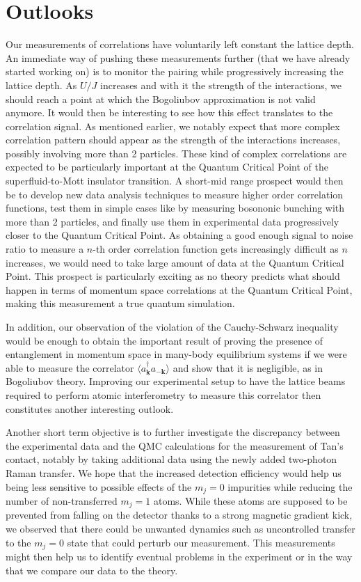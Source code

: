 \section*{Outlooks}

Our measurements of \kmk correlations have voluntarily left constant the lattice depth. An immediate way of pushing these measurements further (that we have already started working on) is to monitor the pairing while progressively increasing the lattice depth. As $U/J$ increases and with it the strength of the interactions, we should reach a point at which the Bogoliubov approximation is not valid anymore. It would then be interesting to see how this effect translates to the \kmk correlation signal. As mentioned earlier, we notably expect that more complex correlation pattern should appear as the strength of the interactions increases, possibly involving more than 2 particles. These kind of complex correlations are expected to be particularly important at the Quantum Critical Point of the superfluid-to-Mott insulator transition. A short-mid range prospect would then be to develop new data analysis techniques to measure higher order correlation functions, test them in simple cases like by measuring bosononic bunching with more than 2 particles, and finally use them in experimental data progressively closer to the Quantum Critical Point. As obtaining a good enough signal to noise ratio to measure a $n$-th order correlation function gets increasingly difficult as $n$ increases, we would need to take large amount of data at the Quantum Critical Point. This prospect is particularly exciting as no theory predicts what should happen in terms of momentum space correlations at the Quantum Critical Point, making this measurement a true quantum simulation. 

In addition, our observation of the violation of the Cauchy-Schwarz inequality would be enough to obtain the important result of proving the presence of entanglement in momentum space in many-body equilibrium systems if we were able to measure the correlator  $\langle a^{\dagger}_{\bm k} a_{-\bm k} \rangle$ and show that it is negligible, as in Bogoliubov theory. Improving our experimental setup to have the lattice beams required to perform atomic interferometry to measure this correlator then constitutes another interesting outlook.

Another short term objective is to further investigate the discrepancy between the experimental data and the QMC calculations for the measurement of Tan's contact, notably by taking additional data using the newly added two-photon Raman transfer. We hope that the increased detection efficiency would help us being less sensitive to possible effects of the $m_j=0$ impurities while reducing the number of non-transferred $m_j=1$ atoms. While these atoms are supposed to be prevented from falling on the detector thanks to a strong magnetic gradient kick, we observed that there could be unwanted dynamics such as uncontrolled transfer to the $m_j=0$ state that could perturb our measurement. This measurements might then help us to identify eventual problems in the experiment or in the way that we compare our data to the theory.


